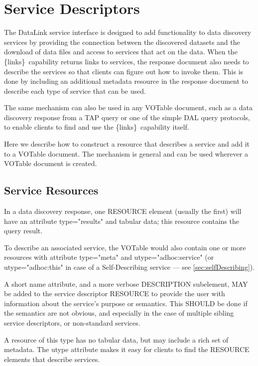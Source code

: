 \documentclass[11pt,a4paper]{ivoa}
\newcommand{\blinks}{\{links\}}
\newcommand{\attval}[2]{#1={\allowbreak}{"}#2{"}}
\begin{document}
\section{Service Descriptors}
\label{sec:serviceDescriptors}

The DataLink service interface is designed to add functionality to data
discovery services by providing the connection between the discovered
datasets and the download of data files and access to services that act
on the data. When the \blinks\ capability returns links to services, the
response document also needs to describe the services so that clients can
figure out how to invoke them. This is done by including an additional
metadata resource in the response document to describe each type of
service that can be used.

The same mechanism can also be used in any VOTable document, such
as a data discovery response from a TAP query or one of the simple
DAL query protocols, to enable clients to find and use the \blinks\
capability itself.

Here we describe how to construct a resource that describes a service
and add it to a VOTable document. The mechanism is general and can be
used wherever a VOTable document is created.


\subsection{Service Resources}
\label{sec:serviceResources}

In a data discovery response, one RESOURCE element (usually the first)
will have an attribute \attval{type}{results} and tabular data; this resource
contains the query result.

To describe an associated service, the VOTable would also
contain one or more resources with attribute \attval{type}{meta} and
\attval{utype}{adhoc:service}  (or \attval{utype}{adhoc:this} in case of
a Self-Describing service --- see \ref{sec:selfDescribing}).

A short name attribute, and a more verbose DESCRIPTION  subelement,
MAY be added to the service descriptor RESOURCE to  provide the user
with information about the service's purpose or  semantics. This SHOULD
be done if the semantics are not obvious,  and especially in the case
of multiple sibling service  descriptors, or non-standard services.

A resource of this type has no tabular data,
but may include a rich set of metadata. The utype attribute makes it
easy for clients to find the RESOURCE elements that describe services.
\end{document}

